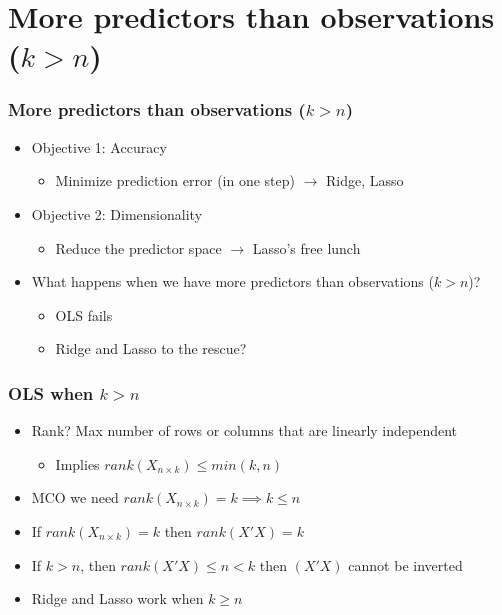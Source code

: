 \documentclass[
  shownotes,
  xcolor={svgnames},
  hyperref={colorlinks,citecolor=DarkBlue,linkcolor=DarkRed,urlcolor=DarkBlue}
  , aspectratio=169]{beamer}
\begin{document}
\section{More predictors than observations ($k>n$)}
\begin{frame}[fragile]
\frametitle{More predictors than observations ($k>n$)}

\begin{itemize}
  \item Objective 1: Accuracy
  \begin{itemize}
    \item Minimize prediction error (in one step) $\rightarrow$ Ridge, Lasso
    \end{itemize}
    \medskip
  \item Objective 2: Dimensionality
  \begin{itemize}
    \item Reduce the predictor space $\rightarrow$ Lasso's free lunch
    \end{itemize}
\end{itemize}
\medskip
\pause
\begin{itemize}
  \item What happens when we have more predictors than observations ($k>n$)?
  \begin{itemize}
   \item OLS fails
   \medskip
   \item Ridge and Lasso to the rescue?
  \end{itemize}
\end{itemize}

\end{frame}


\begin{frame}[fragile]
\frametitle{OLS when $k>n$}

\begin{itemize}
  \item Rank? Max number of rows or columns that are linearly independent
  \begin{itemize}
  \item Implies $rank(X_{n\times k}) \leq min(k,n)$
  \end{itemize}
  \bigskip
  \item MCO we need $rank(X_{n\times k})=k \implies k\leq n$
  \bigskip
  \item If $rank(X_{n\times k})=k$ then $rank(X'X)=k$
  \bigskip
  \item If $k>n$, then  $rank(X'X)\leq n < k$ then $(X'X)$ cannot be inverted
  \bigskip
  \item Ridge and Lasso work when $k \geq n$
\end{itemize}

\end{frame}
\end{document}
